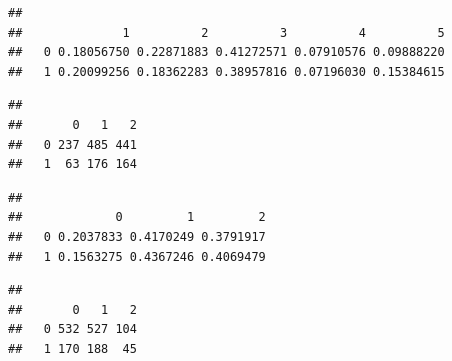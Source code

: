 \documentclass[
  10pt,
]{book}
\newenvironment{Shaded}{\begin{snugshade}}{\end{snugshade}}
\newcommand{\DecValTok}[1]{\textcolor[rgb]{0.00,0.00,0.81}{#1}}
\newcommand{\KeywordTok}[1]{\textcolor[rgb]{0.13,0.29,0.53}{\textbf{#1}}}
\newcommand{\NormalTok}[1]{#1}
\newcommand{\OperatorTok}[1]{\textcolor[rgb]{0.81,0.36,0.00}{\textbf{#1}}}
\begin{document}
\begin{verbatim}
##    
##              1          2          3          4          5
##   0 0.18056750 0.22871883 0.41272571 0.07910576 0.09888220
##   1 0.20099256 0.18362283 0.38957816 0.07196030 0.15384615
\end{verbatim}

\begin{Shaded}
\end{Shaded}

\begin{verbatim}
##    
##       0   1   2
##   0 237 485 441
##   1  63 176 164
\end{verbatim}

\begin{Shaded}
\end{Shaded}

\begin{verbatim}
##    
##             0         1         2
##   0 0.2037833 0.4170249 0.3791917
##   1 0.1563275 0.4367246 0.4069479
\end{verbatim}

\begin{Shaded}
\end{Shaded}

\begin{verbatim}
##    
##       0   1   2
##   0 532 527 104
##   1 170 188  45
\end{verbatim}

\begin{Shaded}
\end{Shaded}
\end{document}
